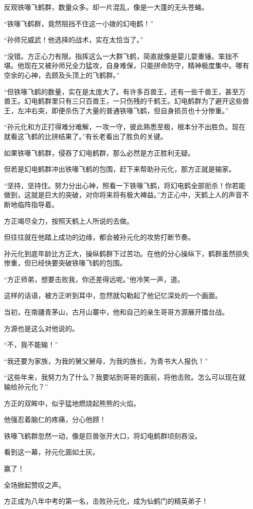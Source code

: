 \begin{this_body}
反观铁喙飞鹤群，数量众多。却一片混乱，像是一大蓬的无头苍蝇。

“铁喙飞鹤群，竟然阻挡不住这一小拨的幻电鹤！”

“孙师兄威武！他选择的战术，实在太恰当了。”

“没错。方正心力有限。指挥这么一大群飞鹤，简直就像是婴儿耍重锤。笨拙不堪。他现在又被孙师兄全力猛攻，自身难保，只能拼命防守，精神极度集中。哪有空余的心神，去顾及头顶上的飞鹤群。”

“但铁喙飞鹤的数量，实在是太庞大了。有许多百兽王，还有一些千兽王，甚至万兽王。幻电鹤群里只有三只百兽王，一只伤残的千鹤王。幻电鹤群为了避开这些兽王，左冲右突，即便杀伤了大量的普通铁喙飞鹤，但自身损员也十分惨重。”

“孙元化和方正打得难分难解，一攻一守，彼此熟悉至极，根本分不出胜负。现在就看这飞鹤的比拼结果了。”有长老看出了胜负的关键。

如果铁喙飞鹤群，侵吞了幻电鹤群，那么必然是方正胜利无疑。

但若是幻电鹤群冲出铁喙飞鹤的包围，赶下来帮助孙元化，那方正就是输家。

“坚持，坚持住。努力分出心神，照看一下铁喙飞鹤，将幻电鹤全部扼杀！你若能做到，这就是巨大的突破，对你将来将有极大裨益。”方正心中，天鹤上人的声音不断地临阵指导着。

方正竭尽全力，按照天鹤上人所说的去做。

但往往就在他踏上成功的边缘，都会被孙元化的攻势打断节奏。

孙元化到底年龄比方正大，操纵鹤群下过苦功。在他的分心操纵下，鹤群虽然损失惨重，但已经快要突破铁喙飞鹤的包围。

“方正师弟，想要击败我，你还差得远呢。”他冷笑一声，道。

这样的话语，被方正听到耳中，忽然就勾勒起了他记忆深处的一个画面。

当初，在南疆青茅山，古月山寨中，他和自己的亲生哥哥方源展开擂台战。

方源也是这么对他说的。

“不，我不能输！”

“我还要为家族，为我的舅父舅母，为我的族长，为青书大人报仇！”

“这些年来，我努力为了什么？我要站到哥哥的面前，将他击败。怎么可以现在就输给孙元化？”

方正的双眸中，似乎猛地燃烧起熊熊的火焰。

他强忍着脑仁的疼痛，分心他顾！

铁喙飞鹤群忽然一动，像是巨兽张开大口，将幻电鹤群顷刻吞没。

看到这一幕，孙元化面如土灰。

赢了！

全场掀起赞叹之声。

方正成为八年中考的第一名，击败孙元化，成为仙鹤门的精英弟子！

\end{this_body}

